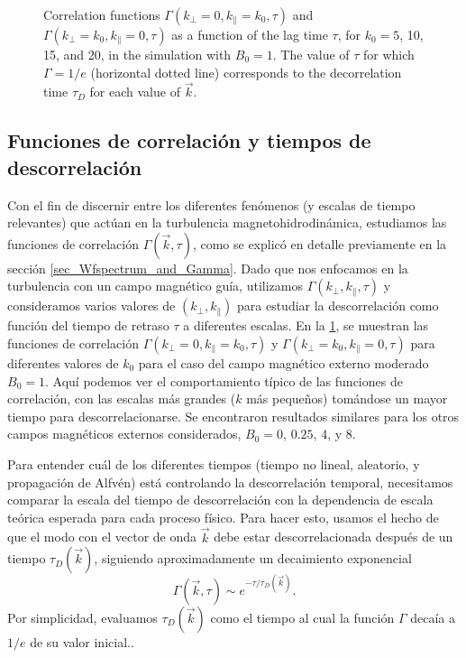 \begin{figure}
  \centering

  \caption{Correlation functions
    $\Gamma(k_\perp=0,k_\parallel=k_0,\tau)$ and
    $\Gamma(k_\perp=k_0,k_\parallel=0,\tau)$ as a function of the lag
    time $\tau$, for $k_0=5$, 10, 15, and 20, in the simulation with
    $B_0=1$. The value of $\tau$ for which $\Gamma=1/e$ (horizontal
    dotted line) corresponds to the decorrelation time $\tau_D$ for
    each value of $\vec{k}$.}
  \label{fig4:B1_bvf_b_kperp/kpara0}
\end{figure}


\subsection{Funciones de correlación y tiempos de descorrelación}

Con el fin de discernir entre los diferentes fenómenos (y escalas de
tiempo relevantes) que actúan en la turbulencia magnetohidrodinámica,
estudiamos las funciones de correlación $\Gamma(\vec{k},\tau)$, como
se explicó en detalle previamente en la sección
\ref{sec_Wfspectrum_and_Gamma}. Dado que nos enfocamos en la
turbulencia con un campo magnético guía, utilizamos $\Gamma(k_\perp,
k_\parallel, \tau)$ y consideramos varios valores de $(k_\perp,
k_\parallel)$ para estudiar la descorrelación como función del tiempo
de retraso $\tau$ a diferentes escalas.  En la
\cref{fig4:B1_bvf_b_kperp/kpara0}, se muestran las funciones de
correlación $\Gamma(k_\perp=0,k_\parallel=k_0,\tau)$ y
$\Gamma(k_\perp=k_0,k_\parallel=0,\tau)$ para diferentes valores de
$k_0$ para el caso del campo magnético externo moderado $B_0=1$. Aquí
podemos ver el comportamiento típico de las funciones de correlación,
con las escalas más grandes ($k$ más pequeños) tomándose un mayor
tiempo para descorrelacionarse. Se encontraron resultados similares
para los otros campos magnéticos externos considerados, $B_0=0$,
$0.25$, $4$, y $8$.

Para entender cuál de los diferentes tiempos (tiempo no lineal,
\sweeping aleatorio, y propagación de Alfvén) está controlando la
descorrelación temporal, necesitamos comparar la escala del tiempo de
descorrelación con la dependencia de escala teórica esperada para cada
proceso físico. Para hacer esto, usamos el hecho de que el modo con el
vector de onda $\vec{k}$ debe estar descorrelacionada después de un
tiempo $\tau_D(\vec{k})$, siguiendo aproximadamente un decaimiento
exponencial
\begin{equation}
\Gamma(\vec{k},\tau) \sim e^{-\tau/\tau_D(\vec{k})}.
\end{equation}
Por simplicidad, evaluamos $\tau_D(\vec{k})$ como el tiempo al cual la
función $\Gamma$ decaía a $1/e$ de su valor inicial..

